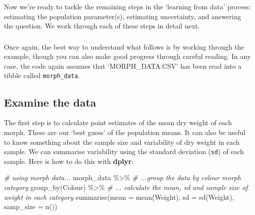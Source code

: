 \documentclass[
]{book}
\newenvironment{Shaded}{\begin{snugshade}}{\end{snugshade}}
\newcommand{\AttributeTok}[1]{\textcolor[rgb]{0.77,0.63,0.00}{#1}}
\newcommand{\CommentTok}[1]{\textcolor[rgb]{0.56,0.35,0.01}{\textit{#1}}}
\newcommand{\FunctionTok}[1]{\textcolor[rgb]{0.00,0.00,0.00}{#1}}
\newcommand{\NormalTok}[1]{#1}
\newcommand{\SpecialCharTok}[1]{\textcolor[rgb]{0.00,0.00,0.00}{#1}}
\newenvironment{greybox}{
  \definecolor{shadecolor}{rgb}{0.95,0.95,0.95}  %
  \color{black}
  \begin{shaded}}
 {\end{shaded}}
\newenvironment{infobox}[1]
  {
  \begin{itemize}
  \renewcommand{\labelitemi}{
    \raisebox{-.7\height}[0pt][0pt]{
      {\setkeys{Gin}{width=3em,keepaspectratio}
        \texttt{[image: images/\#1]}}
    }
  }
  \setlength{\fboxsep}{1em}
  \begin{greybox}
  \item
  }
  {
  \end{greybox}
  \end{itemize}
  }
\begin{document}
Now we're ready to tackle the remaining steps in the `learning from data' process: estimating the population parameter(s), estimating uncertainty, and answering the question. We work through each of these steps in detail next.

\begin{infobox}{action}

\hypertarget{section-1}{%
\subsubsection*{}\label{section-1}}

Once again, the best way to understand what follows is by working through the example, though you can also make good progress through careful reading. In any case, the code again assumes that `MORPH\_DATA.CSV' has been read into a tibble called \texttt{morph\_data}.

\end{infobox}

\hypertarget{examine-the-data}{%
\subsection{Examine the data}\label{examine-the-data}}

The first step is to calculate point estimates of the mean dry weight of each morph. These are our `best guess' of the population means. It can also be useful to know something about the sample size and variability of dry weight in each sample. We can summarise variability using the standard deviation (\texttt{sd}) of each sample. Here is how to do this with \textbf{dplyr}:

\begin{Shaded}
\begin{Highlighting}[]
\CommentTok{\# using morph data...}
\NormalTok{morph\_data }\SpecialCharTok{\%\textgreater{}\%} 
  \CommentTok{\# ...group the data by colour morph category}
  \FunctionTok{group\_by}\NormalTok{(Colour) }\SpecialCharTok{\%\textgreater{}\%} 
  \CommentTok{\# ... calculate the mean, sd and sample size of weight in each category}
  \FunctionTok{summarise}\NormalTok{(}\AttributeTok{mean =} \FunctionTok{mean}\NormalTok{(Weight), }
            \AttributeTok{sd =} \FunctionTok{sd}\NormalTok{(Weight),}
            \AttributeTok{samp\_size =} \FunctionTok{n}\NormalTok{())}
\end{Highlighting}
\end{Shaded}
\end{document}
